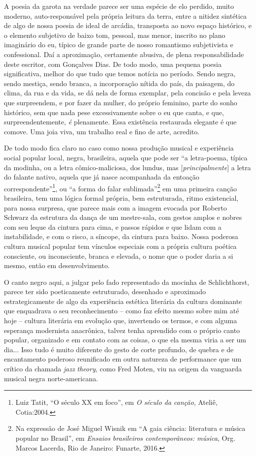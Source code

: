 A poesia da garota na verdade parece ser uma espécie de elo perdido,
muito moderno, auto-responsável pela própria leitura da terra, entre a
nitidez sintética de algo de nossa poesia de ideal de arcádia,
transposta ao novo espaço histórico, e o elemento subjetivo de baixo
tom, pessoal, mas menor, inscrito no plano imaginário do eu, típico de
grande parte de nosso romantismo subjetivista e confessional. Daí a
aproximação, certamente abusiva, de plena responsabilidade deste
escritor, com Gonçalves Dias. De todo modo, uma pequena poesia
significativa, melhor do que tudo que temos notícia no período. Sendo
negra, sendo mestiça, sendo branca, a incorporação nítida do país, da
paisagem, do clima, da rua e da vida, se dá nela de forma exemplar, pela
concisão e pela leveza que surpreendem, e por fazer da mulher, do
próprio feminino, parte do sonho histórico, sem que nada pese
excessivamente sobre o eu que canta, e que, surpreendentemente, \emph{é}
plenamente. Essa existência restaurada elegante é que comove. Uma joia
viva, um trabalho real e fino de arte, acredito.

De todo modo fica claro no caso como nossa produção musical e
experiência social popular local, negra, brasileira, aquela que pode ser
``a letra-poema, típica da modinha, ou a letra cômico-maliciosa, dos
lundus, mas {[}\emph{principalmente}{]} a letra do falante nativo,
aquela que já nasce acompanhada da entoação correspondente''\footnote{Luiz
  Tatit, ``O século XX em foco'', em \emph{O século da canção}, Ateliê,
  Cotia:2004.}, ou ``a forma do falar sublimada''\footnote{Na expressão
  de José Miguel Wisnik em ``A gaia ciência: literatura e música popular
  no Brasil'', em \emph{Ensaios brasileiros contemporâneos: música},
  Org. Marcos Lacerda, Rio de Janeiro: Funarte, 2016.} em uma primeira
canção brasileira, tem uma lógica formal própria, bem
estruturada, ritmo existencial, para nossa surpresa, que parece mais com
a imagem evocada por Roberto Schwarz da estrutura da dança de um
mestre-sala, com gestos amplos e nobres com seu leque da cintura para
cima, e passos rápidos e que lidam com a instabilidade, e com o risco, a
síncope, da cintura para baixo. Nossa poderosa cultura musical popular
tem vínculos especiais com a própria cultura poética consciente, ou
inconsciente, branca e elevada, o nome que o poder daria a si mesmo,
então em desenvolvimento.

O canto negro aqui, a julgar pelo fado representado da mocinha de
Schlichthorst, parece ter sido poeticamente estruturado, desenhado e
aproximado estrategicamente de algo da experiência estética literária da
cultura dominante que enquadrava o seu reconhecimento -- como faz efeito
mesmo sobre mim até hoje -- cultura literária em evolução que,
invertendo os termos, e com alguma esperança modernista anacrônica,
talvez tenha aprendido com o próprio canto popular, organizado e em
contato com as coisas, o que ela mesma viria a ser um dia... Isso tudo é
muito diferente do gesto de corte profundo, de quebra e de encantamento
poderoso reunificado em outra natureza de performance que um crítico da
chamada \emph{jazz} \emph{theory}, como Fred Moten, viu na origem da
vanguarda musical negra norte-americana.

